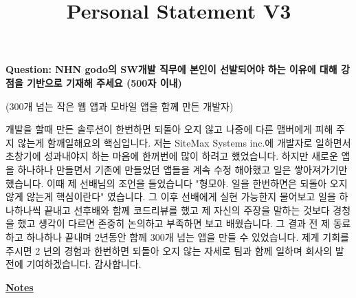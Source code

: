 \documentclass[12pt]{article}
\begin{document}
\title{Personal Statement V3}
\maketitle

\textbf{Question: NHN godo의 SW개발 직무에 본인이 선발되어야 하는 이유에 대해 강점을 기반으로 기재해 주세요 (500자 이내)}

\bigskip

(300개 넘는 작은 웹 앱과 모바일 앱을 함께 만든 개발자)

\bigskip

개발을 할때 만든 솔루션이 한번하면 되돌아 오지 않고 나중에 다른 맴버에게 피해 주지 않는게 함깨일해요의 핵심입니다.
저는 SiteMax Systems inc.에 개발자로 일하면서 초창기에 성과내야지 하는 마음에 한꺼번에 많이 하려고 했었습니다.
하지만 새로운 앱을 하나하나 만들면서 기존에 만들었던 앱들을 계속 수정 해야했고 일은 쌓아져가기만 했습니다.
이때 제 선배님의 조언을 들었습니다 "형모야. 일을 한번하면은 되돌아 오지 않게 않는게 핵심이란다" 였습니다.
그 이후 선배에게 실현 가능한지 물어보고 일을 하나하나씩 끝내고 선후배와 함께 코드리뷰를 했고 제 자신의 주장을 말하는 것보다 경청을 했고 생각이 다르면 존중히 논의하고 부족하면 보고 배웠습니다.
그 결과 전 제 동료하고 하나하나 끝내며 2년동안 함께 300개 넘는 앱을 만들 수 있었습니다.
제게 기회를 주시면 2 년의 경험과 한번하면 되돌아 오지 않는 자세로 팀과 함께 일하며 회사의 발전에 기여하겠습니다. 감사합니다.

\underline{\textbf{Notes}}
\end{document}
